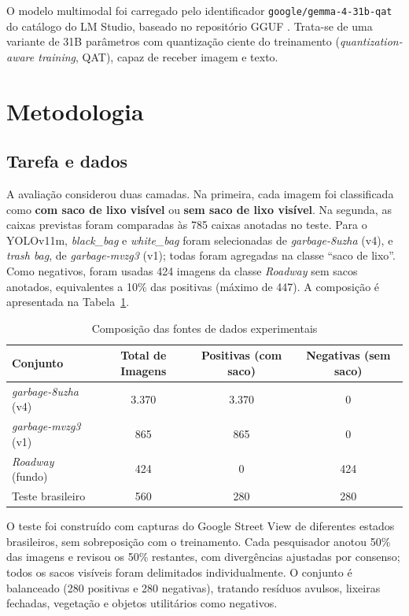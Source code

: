 \documentclass[kdmile,a4paper]{kdmile}
\begin{document}
O modelo multimodal foi carregado pelo identificador \texttt{google/gemma-4-31b-qat} do catálogo do LM Studio, baseado no repositório GGUF  \cite{LMStudioGemma431BQAT}. Trata-se de uma variante de 31B parâmetros com quantização ciente do treinamento (\emph{quantization-aware training}, QAT), capaz de receber imagem e texto.

\section{Metodologia}
\label{sec:metodologia}

\subsection{Tarefa e dados}
\label{sec:tarefa-dados}

A avaliação considerou duas camadas. Na primeira, cada imagem foi classificada como \textbf{com saco de lixo visível} ou \textbf{sem saco de lixo visível}. Na segunda, as caixas previstas foram comparadas às 785 caixas anotadas no teste. Para o YOLOv11m, \emph{black\_bag} e \emph{white\_bag} foram selecionadas de \emph{garbage-8uzha} (v4), e \emph{trash bag}, de \emph{garbage-mvzg3} (v1); todas foram agregadas na classe ``saco de lixo''. Como negativos, foram usadas 424 imagens da classe \emph{Roadway} sem sacos anotados, equivalentes a 10\% das positivas (máximo de 447). A composição é apresentada na Tabela~\ref{tab:conjuntos}.

\begin{table}[htbp]
\centering
\footnotesize
\caption{Composição das fontes de dados experimentais}
\label{tab:conjuntos}
\begin{tabular}{lccc}
\toprule
\textbf{Conjunto} & \textbf{Total de Imagens} & \textbf{Positivas (com saco)} & \textbf{Negativas (sem saco)} \\
\midrule
\emph{garbage-8uzha} (v4) & 3.370 & 3.370 & 0 \\
\emph{garbage-mvzg3} (v1) & 865 & 865 & 0 \\
\emph{Roadway} (fundo) & 424 & 0 & 424 \\
Teste brasileiro & 560 & 280 & 280 \\
\bottomrule
\end{tabular}
\end{table}

O teste foi construído com capturas do Google Street View de diferentes estados brasileiros, sem sobreposição com o treinamento. Cada pesquisador anotou 50\% das imagens e revisou os 50\% restantes, com divergências ajustadas por consenso; todos os sacos visíveis foram delimitados individualmente. O conjunto é balanceado (280 positivas e 280 negativas), tratando resíduos avulsos, lixeiras fechadas, vegetação e objetos utilitários como negativos.
\end{document}

